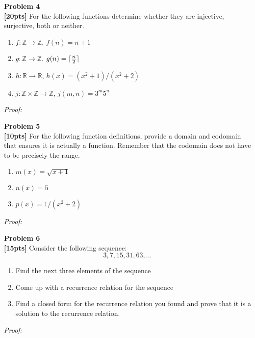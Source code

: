 \documentclass{article}
\newenvironment{problem}[2][Problem]
    { \begin{mdframed}[backgroundcolor=gray!20] \textbf{#1 #2} \\}
    {  \end{mdframed}}
\newenvironment{solution}
    {\textit{Proof:}}
    {}
\DeclarePairedDelimiter\ceil{\lceil}{\rceil}
\begin{document}
\begin{problem}{4}
\textbf{[20pts]} For the following functions determine whether they are injective, surjective, both or neither.
\begin{enumerate}[label=(\alph*)]
\item $f:\mathbb{Z}\rightarrow\mathbb{Z}$, $f(n)=n+1$
\item $g:\mathbb{Z}\rightarrow\mathbb{Z}$, $g(n)=\ceil{\frac{n}{2}}$
\item $h:\mathbb{R\rightarrow\mathbb{R}}$, $h(x) = (x^2+1)/(x^2+2)$
\item $j:\mathbb{Z}\times\mathbb{Z}\rightarrow\mathbb{Z}$, $j(m,n)=3^m5^n$
\end{enumerate}
\end{problem}
\begin{solution}
\end{solution}

\begin{problem}{5}
\textbf{[10pts]} For the following function definitions, provide a domain and codomain that ensures it is actually a function. Remember that the codomain does not have to be precisely the range.
\begin{enumerate}[label=(\alph*)]
    \item $m(x)=\sqrt{x+1}$
    \item $n(x)=5$
    \item $p(x)=1/(x^2+2)$
\end{enumerate}
\end{problem}
\begin{solution}
\end{solution}

\begin{problem}{6}
\textbf{[15pts]}  Consider the following sequence:
$$ 3,7,15,31,63,... $$
\begin{enumerate}[label=(\alph*)]
    \item Find the next three elements of the sequence
    \item Come up with a recurrence relation for the sequence
    \item Find a closed form for the recurrence relation you found and prove that it is a solution to the recurrence relation.
\end{enumerate}
\end{problem}
\begin{solution}
\end{solution}
\end{document}
